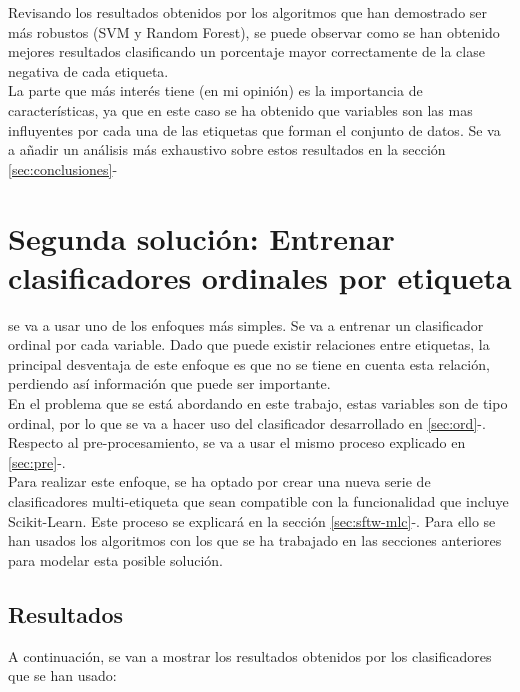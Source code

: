 Revisando los resultados obtenidos por los algoritmos que han demostrado ser más robustos (SVM y Random Forest), se puede observar como se han obtenido mejores resultados clasificando un porcentaje mayor correctamente de la clase negativa de cada etiqueta.\\
\linebreak
La parte que más interés tiene (en mi opinión) es la importancia de características, ya que en este caso se ha obtenido que variables son las mas influyentes por cada una de las etiquetas que forman el conjunto de datos. Se va a añadir un análisis más exhaustivo sobre estos resultados en la sección \ref{sec:conclusiones}-

\section{Segunda solución: Entrenar clasificadores ordinales por etiqueta}
se va a usar uno de los enfoques más simples. Se va a entrenar un clasificador ordinal por cada variable.
Dado que puede existir relaciones entre etiquetas, la principal desventaja de este enfoque es que no se tiene en cuenta esta relación, perdiendo así información que puede ser importante.\\
\linebreak
En el problema que se está abordando en este trabajo, estas variables son de tipo ordinal, por lo que se va a hacer uso del clasificador desarrollado en \ref{sec:ord}-.
Respecto al pre-procesamiento, se va a usar el mismo proceso explicado en \ref{sec:pre}-.\\

Para realizar este enfoque, se ha optado por crear una nueva serie de clasificadores multi-etiqueta que sean compatible con la funcionalidad que incluye Scikit-Learn. Este proceso se explicará en la sección \ref{sec:sftw-mlc}-. Para ello se han usados los algoritmos con los que se ha trabajado en las secciones anteriores para modelar esta posible solución.
\subsection{Resultados}
A continuación, se van a mostrar los resultados obtenidos por los clasificadores que se han usado:
